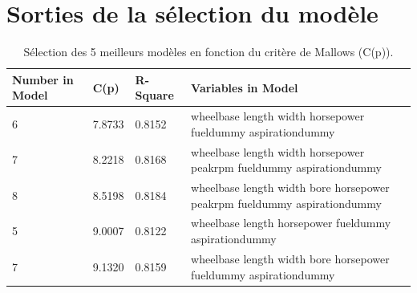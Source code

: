 \documentclass[11pt,a4paper]{article}
\begin{document}
\section{Sorties de la sélection du modèle}
\begin{table}[h]
	\small
	\begin{tabulary}{1\textwidth}{LlLJ}
		\hline
		
		Number in Model &    C(p) &    R-Square &    Variables in Model\\\hline
		
		6 &    7.8733 &    0.8152 &    wheelbase length width horsepower fueldummy aspirationdummy\\
		7 &    8.2218 &    0.8168 &    wheelbase length width horsepower peakrpm fueldummy aspirationdummy\\
		8 &    8.5198 &    0.8184 &    wheelbase length width bore horsepower peakrpm fueldummy aspirationdummy\\
		5 &    9.0007 &    0.8122 &    wheelbase length horsepower fueldummy aspirationdummy\\
		7 &    9.1320 &    0.8159 &    wheelbase length width bore horsepower fueldummy aspirationdummy\\\hline
		
	\end{tabulary}
	
	\caption{Sélection des 5 meilleurs modèles en fonction du critère de Mallows (C(p)).}
	\label{table:mallows}
\end{table}
\end{document}
